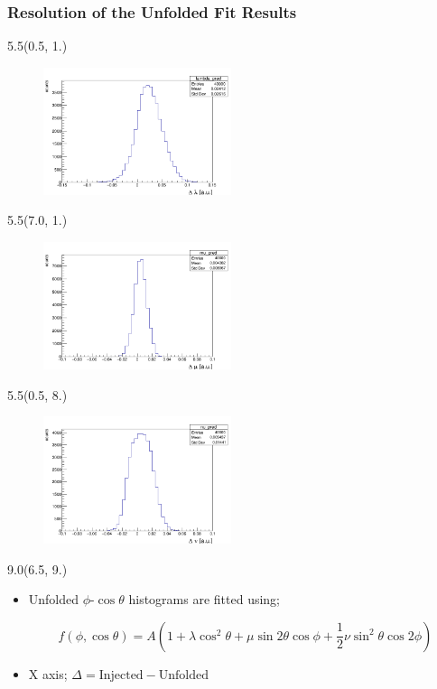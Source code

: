 \documentclass[12pt, xcolor={dvipsnames}, aspectratio = 169, sans, mathserif]{beamer}
\newenvironment{List}[2]
{\begin{textblock}{#1}#2
\begin{itemize}}
{\end{itemize}
\end{textblock}}
\newenvironment{Pic}[2]
{\begin{textblock}{#1}#2
\begin{figure}}
{\end{figure}
\end{textblock}}
\begin{document}
\begin{frame}
\frametitle{Resolution of the Unfolded Fit Results}

\begin{Pic}{5.5}{(0.5, 1.)}
  \includegraphics[width=5.5cm]{imgs/lambda_pred.png}
\end{Pic}

\begin{Pic}{5.5}{(7.0, 1.)}
  \includegraphics[width=5.5cm]{imgs/mu_pred.png}
\end{Pic}

\begin{Pic}{5.5}{(0.5, 8.)}
  \includegraphics[width=5.5cm]{imgs/nu_pred.png}
\end{Pic}

\begin{List}{9.0}{(6.5, 9.)}

  \item Unfolded $\phi$-$\cos\theta$ histograms are fitted using;

\begin{scriptsize}
\begin{equation*}
f(\phi, \cos\theta) = A(1  + \lambda \cos^{2}\theta + \mu \sin 2 \theta \cos \phi + \dfrac{1}{2}\nu \sin^{2}\theta \cos 2 \phi)
\end{equation*}
\end{scriptsize}

  \item X axis;  $\Delta = \text{Injected} - \text{Unfolded}$

\end{List}
\end{frame}
\end{document}

